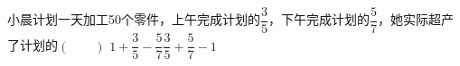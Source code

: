 小晨计划一天加工50个零件，上午完成计划的$\dfrac{3}{5}$，下午完成计划的$\dfrac{5}{7}$，她实际超产了计划的\hfill$\left(\qquad\right)$
{$1+\dfrac{3}{5}-\dfrac{5}{7}$}{$\dfrac{3}{5}+\dfrac{5}{7}-1$}
